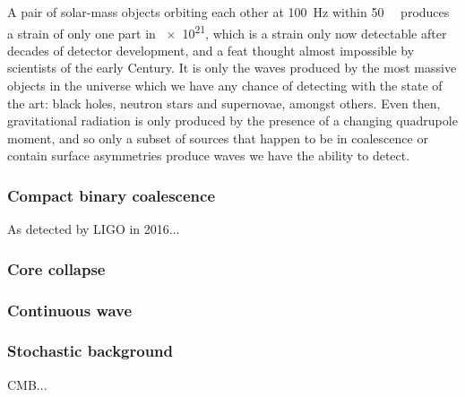 A pair of solar-mass objects orbiting each other at \SI{100}{\hertz} within \SI{50}{\mega\lightyear} produces a strain of only one part in \SI{e21}{}, which is a strain only now detectable after decades of detector development, and a feat thought almost impossible by scientists of the early  Century. It is only the waves produced by the most massive objects in the universe which we have any chance of detecting with the state of the art: black holes, neutron stars and supernovae, amongst others. Even then, gravitational radiation is only produced by the presence of a changing quadrupole moment, and so only a subset of sources that happen to be in coalescence or contain surface asymmetries produce waves we have the ability to detect.

\subsubsection{Compact binary coalescence}
As detected by LIGO in 2016...


\subsubsection{Core collapse}

\subsubsection{Continuous wave}

\subsubsection{Stochastic background}
CMB...

